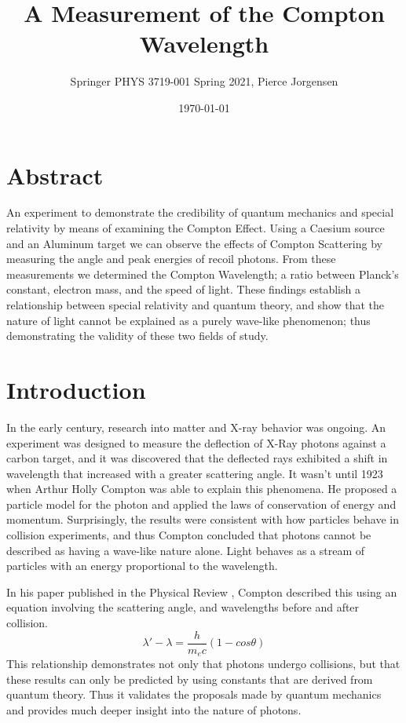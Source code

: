 \documentclass{article}
\title{A Measurement of the Compton Wavelength}
\author{Springer PHYS 3719-001 Spring 2021, Pierce Jorgensen}
\date{\today}
\begin{document}
\maketitle

\section{Abstract}

An experiment to demonstrate the credibility of quantum mechanics and special relativity by means of examining the Compton Effect. Using a Caesium source and an Aluminum target we can observe the effects of Compton Scattering by measuring the angle and peak energies of recoil photons. From these measurements we determined the Compton Wavelength; a ratio between Planck's constant, electron mass, and the speed of light. These findings establish a relationship between special relativity and quantum theory, and show that the nature of light cannot be explained as a purely wave-like phenomenon; thus demonstrating the validity of these two fields of study.

\section{Introduction}

In the early  century, research into matter and X-ray behavior was ongoing. An experiment was designed to measure the deflection of X-Ray photons against a carbon target, and it was discovered that the deflected rays exhibited a shift in wavelength that increased with a greater scattering angle. It wasn't until 1923 when Arthur Holly Compton was able to explain this phenomena. He proposed a particle model for the photon and applied the laws of conservation of energy and momentum. Surprisingly, the results were consistent with how particles behave in collision experiments, and thus Compton concluded that photons cannot be described as having a wave-like nature alone. Light behaves as a stream of particles with an energy proportional to the wavelength. \cite{Compton} \par

In his paper published in the Physical Review \cite{Phys_Review}, Compton described this using an equation involving the scattering angle, and wavelengths before and after collision.
\begin{equation}
    \lambda' - \lambda = \frac{h}{m_{e}c}(1-cos\theta)
\end{equation}
This relationship demonstrates not only that photons undergo collisions, but that these results can only be predicted by using constants that are derived from quantum theory. Thus it validates the proposals made by quantum mechanics and provides much deeper insight into the nature of photons.
\end{document}
